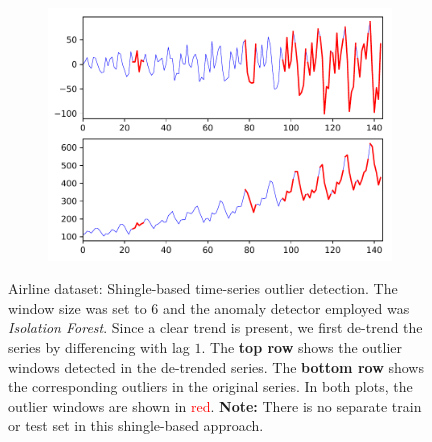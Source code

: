 \documentclass{article} %
\begin{document}
\begin{figure}
	\centering
	\captionsetup{labelformat=empty}
	\begin{subfigure}[b]{1.0\textwidth}
		\includegraphics[width=\textwidth, clip=true, trim=0mm 0mm 0mm 0mm]{timeseries_shingles_airline_w6_ifor}
		\label{fig:airline}
	\end{subfigure}
	\caption{Airline dataset: Shingle-based time-series outlier detection. The window size was set to $6$ and the anomaly detector employed was \textit{Isolation Forest}. Since a clear trend is present, we first de-trend the series by differencing with lag $1$. The \textbf{top row} shows the outlier windows detected in the de-trended series. The \textbf{bottom row} shows the corresponding outliers in the original series. In both plots, the outlier windows are shown in \textcolor{red}{red}. \textbf{Note:} There is no separate train or test set in this shingle-based approach.}
	\label{fig:shingles_airline}
\end{figure}
\end{document}
